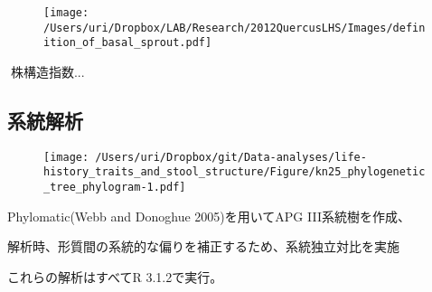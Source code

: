 \documentclass[a0, 30pt, plainboxedsections]{sciposter} %
\begin{document}
\begin{multicols}{3}
{\begin{figure}
	\centering
	\texttt{[image: /Users/uri/Dropbox/LAB/Research/2012QuercusLHS/Images/definition\_of\_basal\_sprout.pdf]}
\end{figure}


株構造指数... 

\columnbreak
\subsection*{\small{系統解析}}

\begin{wrapfigure}{r}{16em}
  \texttt{[image: /Users/uri/Dropbox/git/Data-analyses/life-history\_traits\_and\_stool\_structure/Figure/kn25\_phylogenetic\_tree\_phylogram-1.pdf]}
\end{wrapfigure}

Phylomatic(Webb and Donoghue 2005)を用いてAPG III系統樹を作成、

解析時、形質間の系統的な偏りを補正するため、系統独立対比を実施

これらの解析はすべてR 3.1.2で実行。

}\end{multicols}


\end{document}
